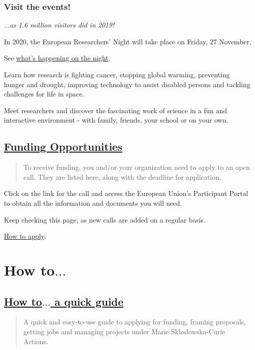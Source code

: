 \documentclass[oneside]{book}
\numberwithin{equation}{section}
\begin{document}
\subsubsection{Visit the events!}
$\ldots$\textit{as 1.6 million visitors did in 2019!}

In 2020, the European Researchers' Night will take place on Friday, 27 November.

%
See \href{https://ec.europa.eu/research/mariecurieactions/events/european-researchers-night-2020_en}{what's happening on the night}.

%
Learn how research is fighting cancer, stopping global warming, preventing hunger and drought, improving technology to assist disabled persons and tackling challenges for life in space.

Meet researchers and discover the fascinating work of science in a fun and interactive environment - with family, friends, your school or on your own.

\subsection{\href{https://ec.europa.eu/research/mariecurieactions/actions/get-funding_en}{Funding Opportunities}}
\begin{quotation}
    To receive funding, you and/or your organization need to apply to an open call. They are listed here, along with the deadline for application.
\end{quotation}
Click on the link for the call and access the European Union's Participant Portal to obtain all the information and documents you will need.

%
Keep checking this page, as new calls are added on a regular basis.

\href{https://ec.europa.eu/research/mariecurieactions/how-to/apply\_en}{How to apply}.

\section{How to$\ldots$}

\subsection{\href{https://ec.europa.eu/research/mariecurieactions/how-quick-guide_en}{How to$\ldots$ a quick guide}}
\begin{quotation}
    A quick and easy-to-use guide to applying for funding, framing proposals, getting jobs and managing projects under Marie Skłodowska-Curie Actions.
\end{quotation}
\end{document}
